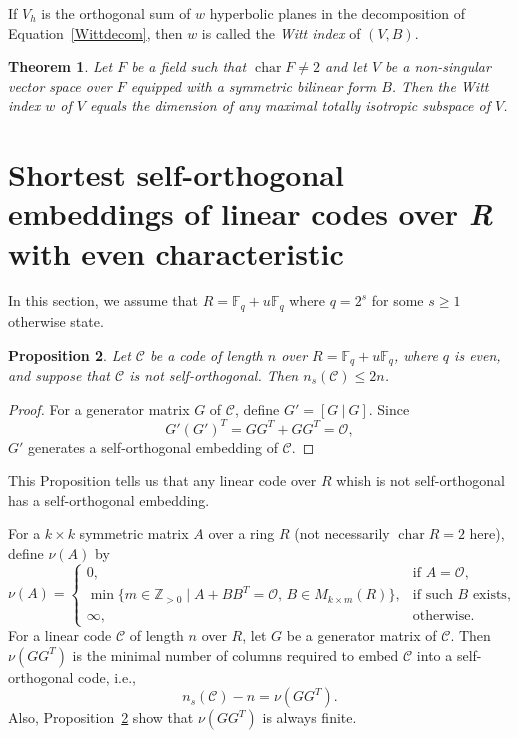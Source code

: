 \documentclass{article}
\newtheorem{theorem}{Theorem}[section]
\newtheorem{proposition}[theorem]{Proposition}
\theoremstyle{definition}
\theoremstyle{remark}
\begin{document}
If $V_h$ is the orthogonal sum of $w$ hyperbolic planes in the decomposition of Equation~\ref{Wittdecom}, then $w$ is called the \textit{Witt index} of $(V, B)$. 

\begin{theorem}
Let $F$ be a field such that $\operatorname{char}F\ne 2$ and let $V$ be a non-singular vector space over $F$ equipped with a symmetric bilinear form $B$. Then the Witt index $w$ of $V$ equals the dimension of any maximal totally isotropic subspace of $V$.
\end{theorem}

\section{Shortest self-orthogonal embeddings of linear codes over {\it R} with even characteristic}\label{sec3}
In this section, we assume that $R=\mathbb{F}_q+u\mathbb{F}_q$ where $q=2^s$ for some $s\ge 1$ otherwise state.

\begin{proposition}\label{soexist}
    Let $\mathcal{C}$ be a code of length $n$ over $R=\mathbb{F}_q+u\mathbb{F}_q$, where $q$ is even, and suppose that $\mathcal{C}$ is not self-orthogonal. Then $n_s(\mathcal{C})\le 2n$.
\end{proposition}
\begin{proof}
    For a generator matrix $G$ of $\mathcal{C}$, define $G'=[G~|~G]$. Since
    \[
    G'(G')^T=GG^T+GG^T=\mathcal{O},
    \]
    $G'$ generates a self-orthogonal embedding of $\mathcal{C}$.
\end{proof}
This Proposition tells us that any linear code over $R$ whish is not self-orthogonal has a self-orthogonal embedding.

For a $k\times k$ symmetric matrix $A$ over a ring $R$ (not necessarily $\operatorname{char}R= 2$ here), define $\nu(A)$ by
\[
\nu(A) = \begin{cases} 
0, & \text{if }A=\mathcal{O},\\
\min \{ m\in\mathbb{Z}_{> 0} \mid A + BB^T = \mathcal{O}, \, B \in M_{k \times m}(R) \}, & \text{if such } B \text{ exists,} \\ 
\infty, & \text{otherwise.} 
\end{cases}
\]
For a linear code $\mathcal{C}$ of length $n$ over $R$, let $G$ be a generator matrix of $\mathcal{C}$. Then $\nu(GG^T)$ is the minimal number of columns required to embed $\mathcal{C}$ into a self-orthogonal code, i.e.,
\[
n_s(\mathcal{C})-n=\nu(GG^T).
\]
Also, Proposition~\ref{soexist} show that $\nu(GG^T)$ is always finite.
\end{document}
